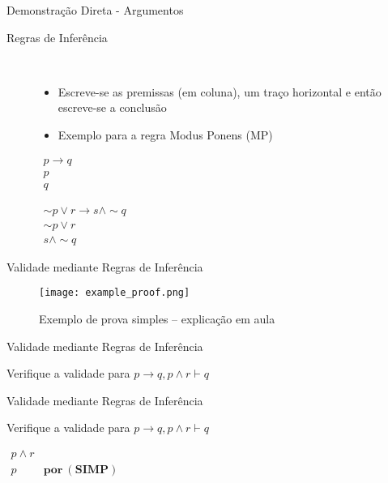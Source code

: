 \begin{frame}[t]{Demonstração Direta - Argumentos}

	\begin{description}
	\item[Regras de Inferência] ~~ 
	\begin{itemize}
	\item Escreve-se as premissas (em coluna), um traço horizontal e então escreve-se a conclusão
	\item Exemplo para a regra Modus Ponens (MP)	
	\end{itemize}	
	
	\vskip 1.5cm
	
	\begin{minipage}{0.3\textwidth}
	$	\begin{array}{l}
	p \rightarrow q  \\
	p  \\
	\hline
	q 
	\end{array}$
	\end{minipage}
	\begin{minipage}{0.3\textwidth}
	$	\begin{array}{l}
	\sim p \vee r \rightarrow s \wedge \sim q \\
	\sim p \vee r \\
	\hline
	s \wedge \sim q
	\end{array}$
	\end{minipage}
	\end{description}		
	
\end{frame}

\begin{frame}[t]{Validade mediante Regras de Inferência}

\begin{figure}[!htb]
\centering 
\texttt{[image: example\_proof.png]}
\caption{Exemplo de prova simples -- explicação em aula}
\label{fig_arvore_prova_simples}
\end{figure}
\end{frame}


\begin{frame}[t]{Validade mediante Regras de Inferência}

	Verifique a validade para $p \rightarrow q, p \wedge r \vdash q$
	
\end{frame}

\begin{frame}[t]{Validade mediante Regras de Inferência}

	Verifique a validade para $p \rightarrow q, p \wedge r \vdash q$
	
	\vskip 1.5cm
	
	\begin{minipage}{0.5\textwidth}
	$	\begin{array}{ll}
	p \wedge r  & \\
	\hline
	p & \mathbf{por~(SIMP)}
	\end{array}$
	\end{minipage}
\end{frame}


